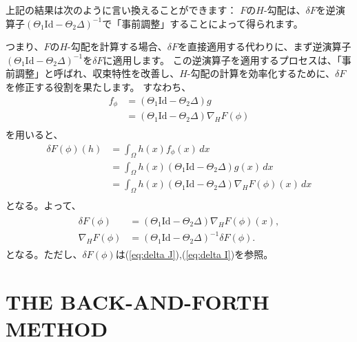 \documentclass{jsarticle}
\theoremstyle{definition}
\begin{document}
{\color{red}
上記の結果は次のように言い換えることができます：
$F$の$H$-勾配は、$\delta F$を逆演算子$(\Theta_1 \text{Id} - \Theta_2\Delta)^{-1}$で「事前調整」することによって得られます。

つまり、$F$の$H$-勾配を計算する場合、$\delta F$を直接適用する代わりに、まず逆演算子$(\Theta_1 \text{Id} - \Theta_2\Delta)^{-1}$を$\delta F$に適用します。
この逆演算子を適用するプロセスは、「事前調整」と呼ばれ、収束特性を改善し、$H$-勾配の計算を効率化するために、$\delta F$を修正する役割を果たします。
すなわち、
\begin{align*}
    f_\phi  &= (\Theta_1 \text{Id} - \Theta_2 \Delta)g\\
            &= (\Theta_1 \text{Id} - \Theta_2 \Delta)\nabla_H F(\phi)\\
\end{align*}
を用いると、
\begin{align*}
    \delta F(\phi)(h)   &= \int_\Omega h(x) f_\phi(x) \, dx \\
                        &= \int_\Omega h(x)(\Theta_1 \text{Id} - \Theta_2 \Delta)g(x) \, dx \\
                        &= \int_\Omega h(x)(\Theta_1 \text{Id} - \Theta_2 \Delta)\nabla_H F(\phi)(x) \, dx \\
\end{align*}
となる。よって、
\begin{align}
    \label{eq:nabla,delta}
    \begin{split}
    \delta F(\phi)  &= (\Theta_1 \text{Id} - \Theta_2 \Delta)\nabla_H F(\phi)(x),\\
    \nabla_H F(\phi) &= (\Theta_1 \text{Id} - \Theta_2 \Delta)^{-1} \delta F(\phi).
    \end{split}
\end{align}
となる。ただし、$\delta F(\phi)$は(\ref{eq:delta J}),(\ref{eq:delta I})を参照。

}


\section{THE BACK-AND-FORTH METHOD}
\end{document}
